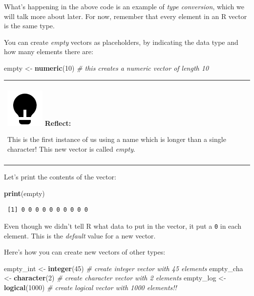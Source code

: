 \documentclass[
]{book}
\newenvironment{Shaded}{\begin{snugshade}}{\end{snugshade}}
\newcommand{\CommentTok}[1]{\textcolor[rgb]{0.56,0.35,0.01}{\textit{#1}}}
\newcommand{\DecValTok}[1]{\textcolor[rgb]{0.00,0.00,0.81}{#1}}
\newcommand{\KeywordTok}[1]{\textcolor[rgb]{0.13,0.29,0.53}{\textbf{#1}}}
\newcommand{\NormalTok}[1]{#1}
\newcommand{\StringTok}[1]{\textcolor[rgb]{0.31,0.60,0.02}{#1}}
\newenvironment{reflect}
{
  \begin{center}
  \begin{tabular}{|>{\columncolor{reflect}}p{0.9\textwidth}|}
  \hline\\
  \includegraphics[scale=0.1]{src/images/lightbulb-fill.png}
  \textbf{Reflect:}
}
{\\\\\hline
  \end{tabular}
  \end{center}
}
\begin{document}
What's happening in the above code is an example of \emph{type conversion}, which we will talk more about later.
For now, remember that every element in an R vector is the same type.

You can create \emph{empty} vectors as placeholders, by indicating the data type and how many elements there are:

\begin{Shaded}
\begin{Highlighting}[]
\NormalTok{empty <-}\StringTok{ }\KeywordTok{numeric}\NormalTok{(}\DecValTok{10}\NormalTok{)   }\CommentTok{# this creates a numeric vector of length 10}
\end{Highlighting}
\end{Shaded}

\begin{reflect}
This is the first instance of us using a name which is longer than a
single character! This new vector is called \emph{empty}.
\end{reflect}

Let's print the contents of the vector:

\begin{Shaded}
\begin{Highlighting}[]
\KeywordTok{print}\NormalTok{(empty)}
\end{Highlighting}
\end{Shaded}

\begin{verbatim}
 [1] 0 0 0 0 0 0 0 0 0 0
\end{verbatim}

Even though we didn't tell R what data to put in the vector, it put a \texttt{0} in each element.
This is the \emph{default} value for a new vector.

Here's how you can create new vectors of other types:

\begin{Shaded}
\begin{Highlighting}[]
\NormalTok{empty_int <-}\StringTok{ }\KeywordTok{integer}\NormalTok{(}\DecValTok{45}\NormalTok{)   }\CommentTok{# create integer vector with 45 elements}
\NormalTok{empty_cha <-}\StringTok{ }\KeywordTok{character}\NormalTok{(}\DecValTok{2}\NormalTok{)  }\CommentTok{# create character vector with 2 elements}
\NormalTok{empty_log <-}\StringTok{ }\KeywordTok{logical}\NormalTok{(}\DecValTok{1000}\NormalTok{)    }\CommentTok{# create logical vector with 1000 elements!!}
\end{Highlighting}
\end{Shaded}
\end{document}

